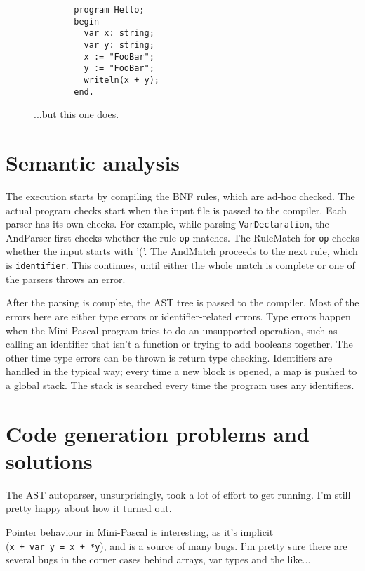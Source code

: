 \documentclass{article}
\def\pascallexer{pascal.py:DelphiLexer -x}
\begin{document}
\FloatBarrier

\begin{figure}[ht!]
    \begin{verbatim}
        program Hello;
        begin
          var x: string;
          var y: string;
          x := "FooBar";
          y := "FooBar";
          writeln(x + y);
        end.
    \end{verbatim}
    \caption{...but this one does.}
\end{figure}

\FloatBarrier

\newpage
\section{Semantic analysis}
The execution starts by compiling the BNF rules, which are ad-hoc checked.
The actual program checks start when the input file is passed to the compiler.
Each parser has its own checks. For example, while parsing
\texttt{VarDeclaration}, the AndParser first checks whether the rule \texttt{op}
matches. The RuleMatch for \texttt{op} checks whether the input starts with
'('. The AndMatch proceeds to the next rule, which is \texttt{identifier}. This
continues, until either the whole match is complete or one of the parsers
throws an error.

After the parsing is complete, the AST tree is passed to the compiler. Most of
the errors here are either type errors or identifier-related errors. Type errors
happen when the Mini-Pascal program tries to do an unsupported operation, such
as calling an identifier that isn't a function or trying to add booleans
together. The other time type errors can be thrown is return type checking.
Identifiers are handled in the typical way; every time a new block is opened, a
map is pushed to a global stack. The stack is searched every time the program
uses any identifiers.

\section{Code generation problems and solutions}
The AST autoparser, unsurprisingly, took a lot of effort to get running. I'm
still pretty happy about how it turned out.

Pointer behaviour in Mini-Pascal is interesting, as it's implicit
(\texttt{x~+~var~y~=~x~+~*y}), and is a source of many bugs. I'm pretty sure
there are several bugs in the corner cases behind arrays, var types and the
like...
\end{document}
